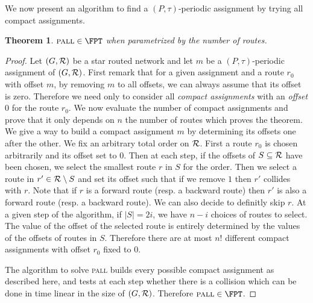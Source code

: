 \documentclass[10pt, conference, letterpaper]{IEEEtran}
\newtheorem{theorem}{Theorem}
\newcommand\pall{\textsc{pall}\xspace}
\begin{document}
We now present an algorithm to find a $(P,\tau)$-periodic assignment 
by trying all compact assignments.

\begin{theorem}\label{th:FPT}
$\pall \in \FPT$ when parametrized by the number of routes.
\end{theorem}
\begin{proof}
Let $(G, {\cal R})$ be a star routed network and let $m$ be a $(P,\tau)$-periodic assignment of $(G, {\cal R})$. First remark that for a given assignment and a route $r_0$ with offset $m$, by removing $m$ to all offsets, we can always assume that its offset is zero. Therefore we need only to consider all \emph{compact assignments} with an \emph{offset $0$} for the route $r_0$. 
We now evaluate the number of compact assignments and prove that it only depends
on $n$ the number of routes which proves the theorem. 
We give a way to build a compact assignment $m$ by determining its offsets one after the other. We fix an arbitrary total order on ${\cal R}$.
First a route $r_0$ is chosen arbitrarily and its offset set to $0$. 
Then at each step, if the offsets of $S \subseteq  {\cal R}$ have been chosen,
we select the smallest route $r$ in $S$ for the order. 
Then we select a route in $r' \in {\cal R} \setminus S$ and set its offset such that 
if we remove $1$ then $r'$ collides with $r$. Note that if $r$ is a forward route (resp. a backward route) then $r'$ is also a forward route (resp. a backward route). We can also decide to definitly skip $r$. At a given step of the algorithm, if $|S| = 2i$, we have $n-i$ choices 
of routes to select. The value of the offset of the selected route is entirely determined by the values of the offsets of routes in $S$. Therefore there are at most $n!$ different compact assignments with offset $r_0$ fixed to $0$. 

The algorithm to solve \pall builds every possible compact assignment as described here, and
tests at each step whether there is a collision which can be done in time linear in the size of 
$(G, {\cal R})$. Therefore $\pall \in \FPT$.
\end{proof}
\end{document}
